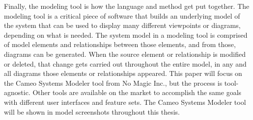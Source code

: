 Finally, the modeling tool is how the language and method get put together. The modeling tool is a critical piece of software that builds an underlying model of the system that can be used to display many different viewpoints or diagrams, depending on what is needed. The system model in a modeling tool is comprised of model elements and relationships between those elements, and from those, diagrams can be generated. When the source element or relationship is modified or deleted, that change gets carried out throughout the entire model, in any and all diagrams those elements or relationships appeared. This paper will focus on the Cameo Systems Modeler tool from No Magic Inc., but the process is tool-agnostic. Other tools are available on the market to accomplish the same goals with different user interfaces and feature sets. The Cameo Systems Modeler tool will be shown in model screenshots throughout this thesis. 
